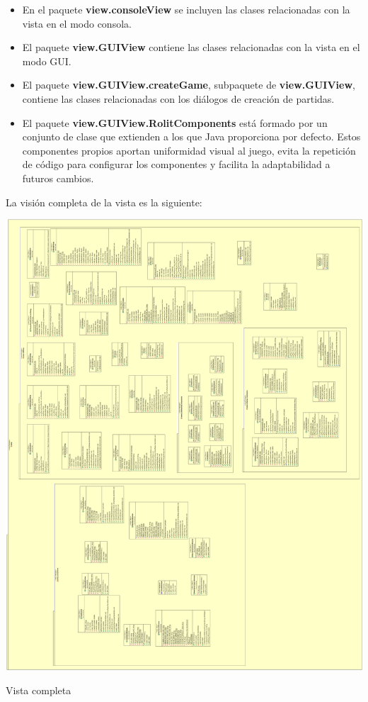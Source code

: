 \documentclass[../DocumentoOficial.tex]{subfiles}
\begin{document}
\begin{itemize}

\item En el paquete \textbf{view.consoleView} se incluyen las clases relacionadas con la vista en el modo consola.

\item El paquete \textbf{view.GUIView} contiene las clases relacionadas con la vista en el modo GUI.

\item El paquete \textbf{view.GUIView.createGame}, subpaquete de \textbf{view.GUIView}, contiene las clases relacionadas con los diálogos de creación de partidas.

\item El paquete \textbf{view.GUIView.RolitComponents} está formado por un conjunto de clase que extienden a los que Java proporciona por defecto. Estos componentes propios aportan uniformidad visual al juego, evita la repetición de código para configurar los componentes y facilita la adaptabilidad a futuros cambios.

\end{itemize}

La visión completa de la vista es la siguiente:

\begin{center}
\includegraphics[scale=0.2]{mvcviewuml.png}

Vista completa
\end{center}
\end{document}
